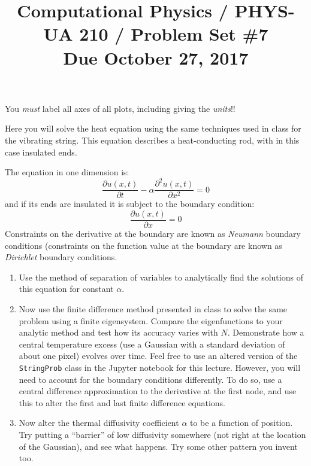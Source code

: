 \documentclass[11pt, preprint]{aastex}
\begin{document}
\title{\bf Computational Physics / PHYS-UA 210 / Problem Set \#7
\\ Due October 27, 2017 }

You {\it must} label all axes of all plots, including giving the {\it
  units}!!

Here you will solve the heat equation using the same techniques used
in class for the vibrating string. This equation describes a
heat-conducting rod, with in this case insulated ends.

The equation in one dimension is:
\begin{equation}
  \frac{\partial u(x, t)}{\partial t} -
  \alpha \frac{\partial^2 u(x,t)}{\partial x^2} = 0
\end{equation}
and if its ends are insulated it is subject to the boundary condition:
\begin{equation}
  \frac{\partial u(x, t)}{\partial x} = 0
\end{equation}
Constraints on the derivative at the boundary are known as {\it
  Neumann} boundary conditions (constraints on the function value at
the boundary are known as {\it Dirichlet} boundary conditions.

\begin{enumerate}
\item Use the method of separation of variables to analytically find
  the solutions of this equation for constant $\alpha$. 
\item Now use the finite difference method presented in class to solve
  the same problem using a finite eigensystem. Compare the
  eigenfunctions to your analytic method and test how its accuracy
  varies with $N$. Demonstrate how a central temperature excess (use a
  Gaussian with a standard deviation of about one pixel) evolves over
  time. Feel free to use an altered version of the {\tt StringProb}
  class in the Jupyter notebook for this lecture. However, you will
  need to account for the boundary conditions differently. To do so,
  use a central difference approximation to the derivative at the
  first node, and use this to alter the first and last finite
  difference equations.
\item Now alter the thermal diffusivity coefficient $\alpha$ to be a
  function of position. Try putting a ``barrier'' of low diffusivity
  somewhere (not right at the location of the Gaussian), and see what
  happens. Try some other pattern you invent too.
\end{enumerate}
\end{document}

